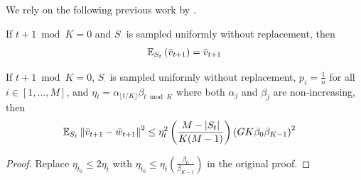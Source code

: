 We rely on the following previous work by \citet{fedavg-conv}.
\begin{lemma}
    \label{lemma: sampling-unbiased}
    If $t + 1 \bmod K = 0$ and $S_\cdot$ is sampled uniformly without replacement, then 
    \begin{align*}
        \mathbb{E}_{S_t} \left( \Bar{v}_{t + 1} \right) = \Bar{v}_{t + 1}
    \end{align*}
\end{lemma}

\begin{lemma}
    \label{lemma: sampling-variance}
    If $t + 1 \bmod K = 0$, $S_\cdot$ is sampled uniformly without replacement, $p_i = \frac{1}{n}$ for all $i \in \left[1, \ldots, M \right]$, and $\eta_t = \alpha_{\lfloor t/K \rfloor} \beta_{t \bmod K}$ where both $\alpha_j$ and $\beta_j$ are non-increasing, then 
    \begin{align*}
        & \mathbb{E}_{S_t} \norm{\Bar{v}_{t + 1} - \Bar{w}_{t + 1}}^2 %
        \leq \eta_t^2 \left( \dfrac{M - \lvert S_t \rvert}{K (M - 1)} \right) \left(G K \beta_{0} \beta_{K - 1} \right)^2
    \end{align*}
\end{lemma}
\begin{proof}
    Replace $\eta_{t_0} \leq 2 \eta_t$ with $\eta_{t_0} \leq \eta_t \left( \frac{\beta_{0}}{\beta_{K - 1}}\right)$ in the original proof.
\end{proof}

